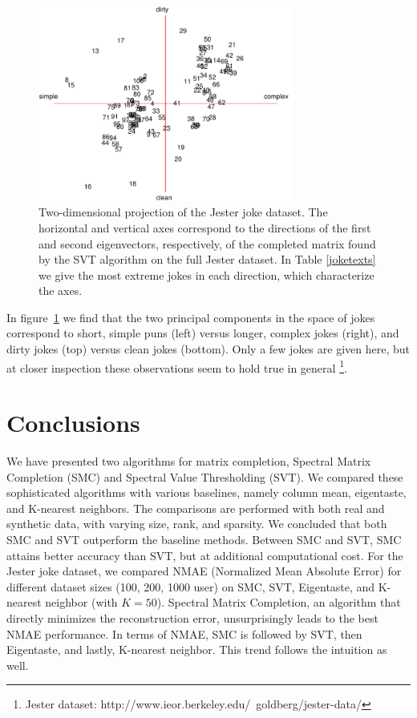 \documentclass{article} %
\begin{document}
\begin{figure} [h]
\centering
\includegraphics[width = 0.75\textwidth]{jokes_2d_2.pdf}
\caption{Two-dimensional projection of the Jester joke dataset. The
  horizontal and vertical axes correspond to the directions of the
  first and second eigenvectors, respectively, of the completed matrix
  found by the SVT algorithm on the full Jester dataset. In Table
  \ref{joketexts} we give the most extreme jokes in each direction,
  which characterize the axes.}
\label{jokes2d}
\end{figure}

In figure~\ref{jokes2d} we find that the two principal components in
the space of jokes correspond to short, simple puns (left) versus
longer, complex jokes (right), and dirty jokes (top) versus clean
jokes (bottom). Only a few jokes are given here, but at closer
inspection these observations seem to hold true in general
\footnote{Jester dataset:
  http://www.ieor.berkeley.edu/~goldberg/jester-data/}.



\section{Conclusions}

We have presented two algorithms for matrix completion, Spectral
Matrix Completion (SMC) and Spectral Value Thresholding (SVT). We
compared these sophisticated algorithms with various baselines, namely
column mean, eigentaste, and K-nearest neighbors. The comparisons are
performed with both real and synthetic data, with varying size, rank,
and sparsity. We concluded that both SMC and SVT outperform the
baseline methods. Between SMC and SVT, SMC attains better accuracy
than SVT, but at additional computational cost. For the Jester joke
dataset, we compared NMAE (Normalized Mean Absolute Error) for
different dataset sizes ({100, 200, 1000} user) on SMC, SVT,
Eigentaste, and K-nearest neighbor (with $K=50$). Spectral Matrix
Completion, an algorithm that directly minimizes the reconstruction
error, unsurprisingly leads to the best NMAE performance. In terms of
NMAE, SMC is followed by SVT, then Eigentaste, and lastly, K-nearest
neighbor. This trend follows the intuition as well.
\end{document}
